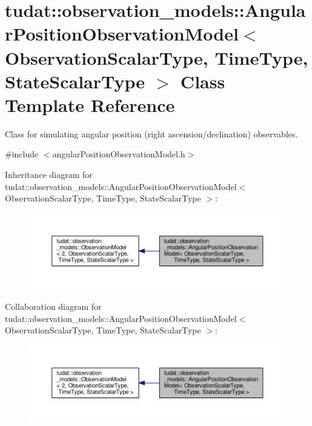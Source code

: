 \hypertarget{classtudat_1_1observation__models_1_1AngularPositionObservationModel}{}\section{tudat\+:\+:observation\+\_\+models\+:\+:Angular\+Position\+Observation\+Model$<$ Observation\+Scalar\+Type, Time\+Type, State\+Scalar\+Type $>$ Class Template Reference}
\label{classtudat_1_1observation__models_1_1AngularPositionObservationModel}


Class for simulating angular position (right ascension/declination) observables.  




{\ttfamily \#include $<$angular\+Position\+Observation\+Model.\+h$>$}



Inheritance diagram for tudat\+:\+:observation\+\_\+models\+:\+:Angular\+Position\+Observation\+Model$<$ Observation\+Scalar\+Type, Time\+Type, State\+Scalar\+Type $>$\+:
\nopagebreak
\begin{figure}[H]
\begin{center}
\leavevmode
\includegraphics[width=350pt]{classtudat_1_1observation__models_1_1AngularPositionObservationModel__inherit__graph}
\end{center}
\end{figure}


Collaboration diagram for tudat\+:\+:observation\+\_\+models\+:\+:Angular\+Position\+Observation\+Model$<$ Observation\+Scalar\+Type, Time\+Type, State\+Scalar\+Type $>$\+:
\nopagebreak
\begin{figure}[H]
\begin{center}
\leavevmode
\includegraphics[width=350pt]{classtudat_1_1observation__models_1_1AngularPositionObservationModel__coll__graph}
\end{center}
\end{figure}
